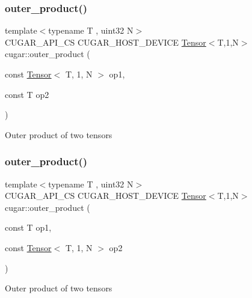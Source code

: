 \subsubsection{\texorpdfstring{outer\+\_\+product()}{outer\_product()}\hspace{0.1cm}{\footnotesize\ttfamily [3/9]}}
{\footnotesize\ttfamily template$<$typename T , uint32 N$>$ \\
C\+U\+G\+A\+R\+\_\+\+A\+P\+I\+\_\+\+CS C\+U\+G\+A\+R\+\_\+\+H\+O\+S\+T\+\_\+\+D\+E\+V\+I\+CE \hyperlink{structcugar_1_1_tensor}{Tensor}$<$T,1,N$>$ cugar\+::outer\+\_\+product (\begin{DoxyParamCaption}\item[{const \hyperlink{structcugar_1_1_tensor}{Tensor}$<$ T, 1, N $>$}]{op1,  }\item[{const T}]{op2 }\end{DoxyParamCaption})}

Outer product of two tensors \mbox{\label{namespacecugar_ace3dc76ae07309680d7e4a437df15948}} 
\subsubsection{\texorpdfstring{outer\+\_\+product()}{outer\_product()}\hspace{0.1cm}{\footnotesize\ttfamily [4/9]}}
{\footnotesize\ttfamily template$<$typename T , uint32 N$>$ \\
C\+U\+G\+A\+R\+\_\+\+A\+P\+I\+\_\+\+CS C\+U\+G\+A\+R\+\_\+\+H\+O\+S\+T\+\_\+\+D\+E\+V\+I\+CE \hyperlink{structcugar_1_1_tensor}{Tensor}$<$T,1,N$>$ cugar\+::outer\+\_\+product (\begin{DoxyParamCaption}\item[{const T}]{op1,  }\item[{const \hyperlink{structcugar_1_1_tensor}{Tensor}$<$ T, 1, N $>$}]{op2 }\end{DoxyParamCaption})}

Outer product of two tensors \mbox{\label{namespacecugar_abcb3266a7078c0ddffce34f4f5852beb}} 
